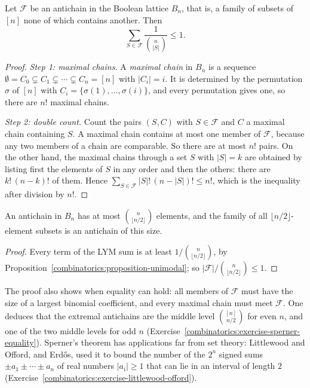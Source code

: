 \begin{theorem}\label{combinatorics:theorem-lym}
Let $\mathcal{F}$ be an antichain in the Boolean lattice $B_n$, that is, a family of subsets of $[n]$ none of which contains another. Then
\[
\sum_{S \in \mathcal{F}}\frac{1}{\binom{n}{|S|}} \leq 1 .
\]
\end{theorem}

\begin{proof}
\emph{Step 1: maximal chains.} A \emph{maximal chain} in $B_n$ is a sequence $\emptyset = C_0 \subsetneq C_1 \subsetneq \cdots \subsetneq C_n = [n]$ with $|C_i| = i$. It is determined by the permutation
$\sigma$ of $[n]$ with $C_i = \{\sigma(1), \ldots, \sigma(i)\}$, and every permutation gives one, so there are $n!$ maximal chains.

\emph{Step 2: double count.} Count the pairs $(S, C)$ with $S \in \mathcal{F}$ and $C$ a maximal chain containing $S$. A maximal chain contains at most one member of $\mathcal{F}$, because any two members
of a chain are comparable. So there are at most $n!$ pairs. On the other hand, the maximal chains through a set $S$ with $|S| = k$ are obtained by listing first the elements of $S$ in any order and then
the others: there are $k!\,(n - k)!$ of them. Hence $\sum_{S \in \mathcal{F}}|S|!\,(n - |S|)! \leq n!$, which is the inequality after division by $n!$.
\end{proof}

\begin{corollary}[Sperner]\label{combinatorics:corollary-sperner}
An antichain in $B_n$ has at most $\binom{n}{\lfloor n/2 \rfloor}$ elements, and the family of all $\lfloor n/2 \rfloor$-element subsets is an antichain of this size.
\end{corollary}

\begin{proof}
Every term of the LYM sum is at least $1/\binom{n}{\lfloor n/2 \rfloor}$, by Proposition~\ref{combinatorics:proposition-unimodal}; so $|\mathcal{F}|/\binom{n}{\lfloor n/2 \rfloor} \leq 1$.
\end{proof}

\begin{remark}\label{combinatorics:remark-sperner-equality}
The proof also shows when equality can hold: all members of $\mathcal{F}$ must have the size of a largest binomial coefficient, and every maximal chain must meet $\mathcal{F}$. One deduces that the extremal
antichains are the middle level $\binom{[n]}{n/2}$ for even $n$, and one of the two middle levels for odd $n$ (Exercise~\ref{combinatorics:exercise-sperner-equality}). Sperner's theorem has
applications far from set theory: Littlewood and Offord, and Erd\H{o}s, used it to bound the number of the $2^n$ signed sums $\pm a_1 \pm \cdots \pm a_n$ of real numbers $|a_i| \geq 1$ that can
lie in an interval of length $2$ (Exercise~\ref{combinatorics:exercise-littlewood-offord}).
\end{remark}


